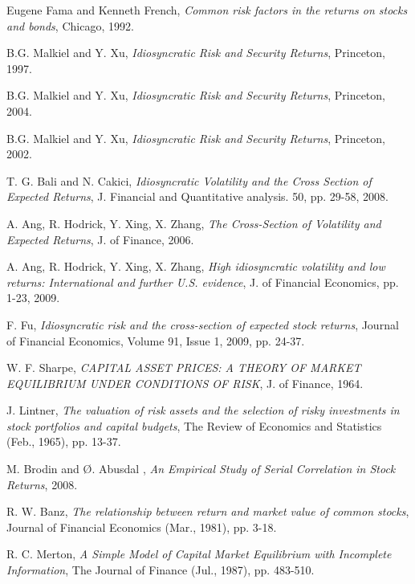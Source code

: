 \begin{thebibliography}{9}

Eugene Fama and Kenneth French, \textit{Common risk factors in the returns on stocks and bonds}, Chicago, 1992.

B.G. Malkiel and Y. Xu, \textit{Idiosyncratic Risk and Security Returns}, Princeton, 1997.

B.G. Malkiel and Y. Xu, \textit{Idiosyncratic Risk and Security Returns}, Princeton, 2004.

B.G. Malkiel and Y. Xu, \textit{Idiosyncratic Risk and Security Returns}, Princeton, 2002.

T. G. Bali and N. Cakici, \textit{Idiosyncratic Volatility and the Cross Section of
Expected Returns}, J. Financial and Quantitative analysis. 50, pp. 29-58, 2008.

A. Ang, R. Hodrick, Y. Xing, X. Zhang, \textit{The Cross-Section of Volatility and Expected Returns}, J. of Finance, 2006.

A. Ang, R. Hodrick, Y. Xing, X. Zhang, \textit{High idiosyncratic volatility and low returns: International and further U.S. evidence}, J. of Financial Economics, pp. 1-23, 2009.

F. Fu, \textit{Idiosyncratic risk and the cross-section of expected stock returns}, Journal of Financial Economics, Volume 91, Issue 1, 2009, pp. 24-37.

W. F. Sharpe, \textit{CAPITAL ASSET PRICES: A THEORY OF MARKET
EQUILIBRIUM UNDER CONDITIONS OF RISK}, J. of Finance, 1964.

J. Lintner, \textit{The valuation of risk assets and the selection of risky investments in stock portfolios and capital budgets}, The Review of Economics and Statistics (Feb., 1965), pp. 13-37.

M. Brodin and Ø. Abusdal , \textit{An Empirical Study of Serial
Correlation in Stock Returns}, 2008.

R. W. Banz, \textit{The relationship between return and market value of common stocks}, Journal of Financial Economics (Mar., 1981), pp. 3-18.

R. C. Merton, \textit{A Simple Model of Capital Market Equilibrium with Incomplete Information}, The Journal of Finance (Jul., 1987), pp. 483-510.


\end{thebibliography}
